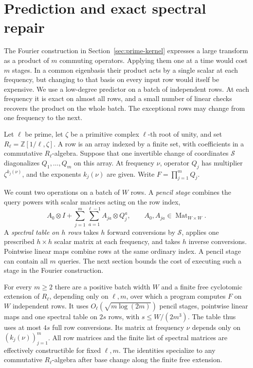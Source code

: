 \section{Prediction and exact spectral repair}\label{sec:repair}

The Fourier construction in Section~\ref{sec:prime-kernel} expresses
a large transform as a product of \(m\) commuting operators. Applying
them one at a time would cost \(m\) stages. In a common eigenbasis their
product acts by a single scalar at each frequency, but changing to that
basis on every input row would itself be expensive. We use a low-degree
predictor on a batch of independent rows. At each frequency it is exact
on almost all rows, and a small number of linear checks recovers the
product on the whole batch. The exceptional rows may change from one
frequency to the next.

Let \(\ell\) be prime, let \(\zeta\) be a primitive complex \(\ell\)-th
root of unity, and set \(R_\ell=\mathbb Z[1/\ell,\zeta]\). A row is an
array indexed by a finite set, with coefficients in a commutative
\(R_\ell\)-algebra. Suppose that one invertible change of coordinates
\(\mathcal S\) diagonalizes \(Q_1,\ldots,Q_m\) on this array. At frequency
\(\nu\), operator \(Q_j\) has multiplier \(\zeta^{k_j(\nu)}\), and the
exponents \(k_j(\nu)\) are given. Write \(F=\prod_{j=1}^m Q_j\).

We count two operations on a batch of \(W\) rows. A \emph{pencil stage}
combines the query powers with scalar matrices acting on the row index,
\begin{equation}\label{eq:repair-pencil}
  A_0\otimes I+\sum_{j=1}^m\sum_{a=1}^{\ell-1}A_{ja}\otimes Q_j^a,
       \qquad A_0,A_{ja}\in\operatorname{Mat}_{W\times W}.
\end{equation}
A \emph{spectral table on \(h\) rows} takes \(h\) forward conversions by
\(\mathcal S\), applies one prescribed \(h\times h\) scalar matrix at
each frequency, and takes \(h\) inverse conversions. Pointwise linear
maps combine rows at the same ordinary index. A pencil stage can
contain all \(m\) queries. The next section bounds the cost of executing
such a stage in the Fourier construction.

\begin{theorem}\label{thm:repair}
For every \(m\ge2\) there are a positive batch width \(W\) and a finite
free cyclotomic extension of \(R_\ell\), depending only on \(\ell,m\),
over which a program computes \(F\) on \(W\) independent rows. It uses
\(O_\ell(\sqrt{m\log(2m)})\) pencil stages, pointwise linear maps and
one spectral table on \(2s\) rows, with \(s\le W/(2m^3)\). The table
thus uses at most \(4s\) full row conversions. Its matrix at frequency
\(\nu\) depends only on \((k_j(\nu))_{j=1}^m\). All row matrices and the
finite list of spectral matrices are effectively constructible for fixed
\(\ell,m\). The identities specialize to any commutative \(R_\ell\)-algebra
after base change along the finite free extension.
\end{theorem}

